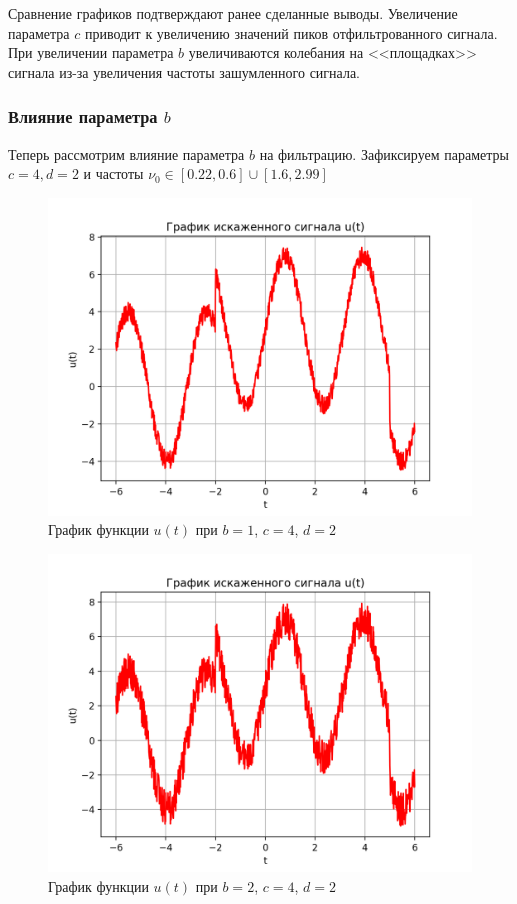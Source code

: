 Сравнение графиков подтверждают ранее сделанные выводы. Увеличение параметра $c$ приводит к увеличению значений пиков отфильтрованного сигнала. При увеличении параметра $b$ увеличиваются колебания на <<площадках>> сигнала из-за увеличения частоты зашумленного сигнала. 

\clearpage

\subsubsection{Влияние параметра $b$}\label{b_ex}

Теперь рассмотрим влияние параметра $b$ на фильтрацию. Зафиксируем параметры $c=4, d=2$ и частоты  $\nu_0 \in [0.22, 0.6] \cup [1.6, 2.99]$

\begin{figure}[ht!]
    \centering
    \includegraphics[scale=0.75]{media/1 task/specific_freq/Noisy_1_4_2.png}
    \caption{График функции $u(t)$ при $b=1$,  $c=4$,  $d=2$}
    \label{fig:noisy_1_4_2}
\end{figure}

\begin{figure}[ht!]
    \centering
    \includegraphics[scale=0.75]{media/1 task/specific_freq/Noisy_2_4_2.png}
    \caption{График функции $u(t)$ при $b=2$,  $c=4$,  $d=2$}
    \label{fig:noisy_2_4_2}
\end{figure}

